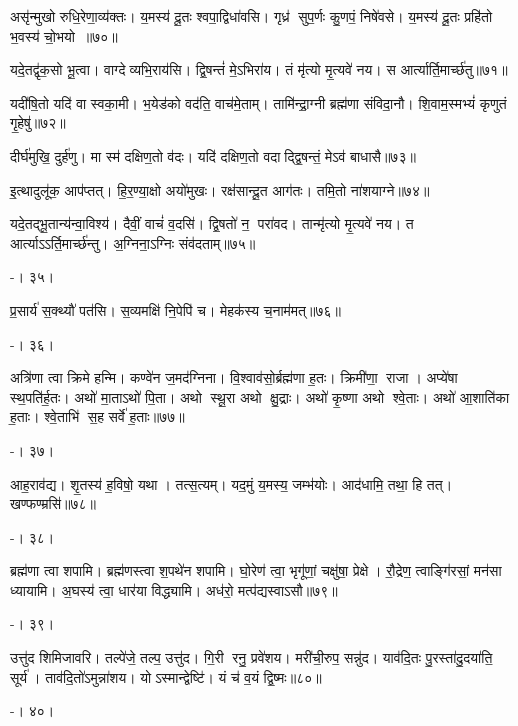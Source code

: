असृ॑न्मुखो रुधि॒रेणा॒व्य॑क्तः। य॒मस्य॑ दू॒तः  श्वपा॒द्विधा॑वसि। गृध्र॑ सुप॒र्णः कु॒णपं॒ निषे॑वसे। य॒मस्य॑ दू॒तः प्रहि॑तो भ॒वस्य॑ चो॒भयो॥७०॥
\anuvakamend

यदे॒तद्वृ॑क॒सो भू॒त्वा। वाग्देव्यभि॒राय॑सि। द्वि॒षन्तं॑ मे॒ऽभिरा॑य। तं मृ॑त्यो मृ॒त्यवे॑ नय। स आर्त्यार्ति॒मार्च्छ॑तु॥७१॥
\anuvakamend

यदी॑षि॒तो यदि॑ वा स्वका॒मी। भ॒येड॑को वद॑ति॒ वाच॑मे॒ताम्। तामि॑न्द्रा॒ग्नी ब्रह्म॑णा संविदा॒नौ। शि॒वाम॒स्मभ्यं॑ कृणुतं गृ॒हेषु॑॥७२॥
\anuvakamend

दीर्घ॑मुखि॒ दुर्\mbox{}ह॑णु। मा स्म॑ दक्षिण॒तो व॑दः। यदि॑ दक्षिण॒तो वदाद्द्वि॒षन्तं॒ मेऽव॑ बाधासै॥७३॥
\anuvakamend

इ॒त्थादुलू॑क॒ आप॑प्तत्। हि॒र॒ण्या॒क्षो अयो॑मुखः। रक्ष॑सान्दू॒त आग॑तः। तमि॒तो ना॑शयाग्ने॥७४॥
\anuvakamend


यदे॒तद्भू॒तान्य॑न्वा॒विश्य॑। दैवीं॒ वाचं॑ व॒दसि॑। द्वि॒षतो॑ न॒ परा॑वद। तान्मृ॑त्यो मृ॒त्यवे॑ नय। त आर्त्याऽऽर्ति॒मार्च्छ॑न्तु। अ॒ग्निना॒ऽग्निः संव॑दताम्॥७५॥

-। ३५।
\anuvakamend


प्र॒सार्य॑ स॒क्थ्यौ॑ पत॑सि। स॒व्यमक्षि॑ नि॒पेपि॑ च। मेहक॑स्य च॒नाम॑मत्॥७६॥

-। ३६।
\anuvakamend


अत्रि॑णा त्वा क्रिमे हन्मि। कण्वे॑न ज॒मद॑ग्निना। वि॒श्वाव॑सो॒र्ब्रह्म॑णा ह॒तः। क्रिमी॑णा॒ राजा। अप्ये॑षा स्थ॒पति॑र्ह॒तः। अथो॑ मा॒ताऽथो॑ पि॒ता। अथो स्थू॒रा अथो क्षु॒द्राः। अथो॑ कृ॒ष्णा अथो श्वे॒ताः। अथो॑ आ॒शाति॑का ह॒ताः। श्वे॒ताभि॑ स॒ह सर्वे॑ ह॒ताः॥७७॥

-। ३७।
\anuvakamend


आह॒राव॑द्य। शृ॒तस्य॑ ह॒विषो॒ यथा। तत्स॒त्यम्। यद॒मुं य॒मस्य॒ जम्भ॑योः। आद॑धामि॒ तथा॒ हि तत्। खण्फण्म्रसि॑॥७८॥

-। ३८।
\anuvakamend


ब्रह्म॑णा त्वा शपामि। ब्रह्म॑णस्त्वा श॒पथे॑न शपामि। घो॒रेण॑ त्वा॒ भृगू॑णां॒ चक्षु॑षा॒ प्रेक्षे। रौ॒द्रेण॒ त्वाङ्गि॑रसां॒ मन॑सा ध्यायामि। अ॒घस्य॑ त्वा॒ धार॑या विद्ध्यामि। अध॑रो॒ मत्प॑द्यस्वाऽसौ॥७९॥

-। ३९।
\anuvakamend


उत्तु॑द शिमिजावरि। तल्पे॑जे॒ तल्प॒ उत्तु॑द। गि॒री रनु॒ प्रवे॑शय। मरी॑ची॒रुप॒ सन्नु॑द। याव॑दि॒तः पु॒रस्ता॑दु॒दया॑ति॒ सूर्य॑। ताव॑दि॒तो॑ऽमुन्ना॑शय। योऽस्मान्द्वेष्टि॑। यं च॑ व॒यं द्वि॒ष्मः॥८०॥

-। ४०।
\anuvakamend


